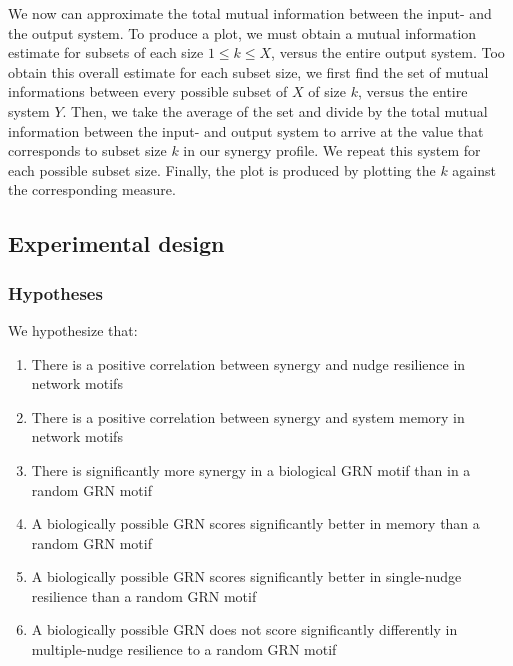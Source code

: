 \documentclass[../main.tex]{subfiles}
\begin{document}
We now can approximate the total mutual information between the input- and the output system.
To produce a plot, we must obtain a mutual information estimate for subsets of each size $1 \le k \le X$, versus the entire output system.
Too obtain this overall estimate for each subset size, we first find the set of mutual informations between every possible subset of $X$ of size $k$, versus the entire system $Y$.
Then, we take the average of the set and divide by the total mutual information between the input- and output system to arrive at the value that corresponds to subset size $k$ in our synergy profile.
We repeat this system for each possible subset size.
Finally, the plot is produced by plotting the $k$ against the corresponding measure.

\subsection{Experimental design}

\subsubsection{Hypotheses}

We hypothesize that:

\begin{enumerate}
\item There is a positive correlation between synergy and nudge resilience in network motifs
\item There is a positive correlation between synergy and system memory in network motifs
\item There is significantly more synergy in a biological GRN motif than in a random GRN motif
\item A biologically possible GRN scores significantly better in memory than a random GRN motif
\item A biologically possible GRN scores significantly better in single-nudge resilience than a random GRN motif
\item A biologically possible GRN does not score significantly differently in multiple-nudge resilience to a random GRN motif
\end{enumerate}
\end{document}
